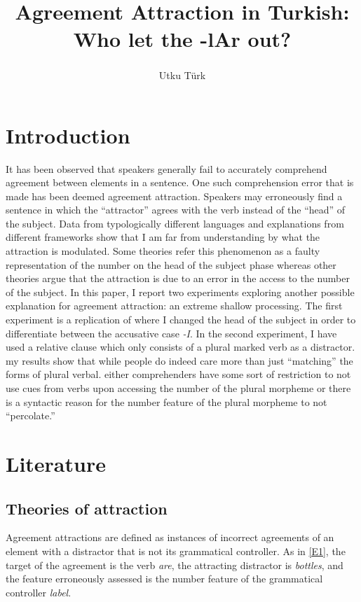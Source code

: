 \documentclass[doc]{apa6}
\title{Agreement Attraction in Turkish: Who let the -lAr out?}
\author{Utku Türk\textsuperscript{}}
\date{}
\affiliation{
\vspace{0.5cm}
\textsuperscript{} Boğaziçi University}
\begin{document}
\maketitle

\section*{Introduction}

It has been observed that speakers generally fail to accurately comprehend agreement between elements in a sentence. One such comprehension error that is made has been deemed agreement attraction. Speakers may erroneously find a sentence in which the \enquote{attractor} agrees with the verb instead of the \enquote{head} of the subject. Data from typologically different languages and explanations from different frameworks show that I am far from understanding by what the attraction is modulated. Some theories refer this phenomenon as a faulty representation of the number on the head of the subject phase whereas other theories argue that the attraction is due to an error in the access to the number of the subject. In this paper, I report two experiments exploring another possible explanation for agreement attraction: an extreme shallow processing. The first experiment is a replication of \textcite{Lago2018} where I changed the head of the subject in order to differentiate between the accusative case \emph{-I}. In the second experiment, I have used a relative clause which only consists of a plural marked verb as a distractor. my results show that while people do indeed care more than just \enquote{matching} the forms of plural verbal. either comprehenders have some sort of restriction to not use cues from verbs upon accessing the number of the plural morpheme or there is a syntactic reason for the number feature of the plural morpheme to not \enquote{percolate.}

\hypertarget{literature}{%
\section{Literature}\label{literature}}

\hypertarget{theories-of-attraction}{%
\subsection{Theories of attraction}\label{theories-of-attraction}}

Agreement attractions are defined as instances of incorrect agreements of an element with a distractor that is not its grammatical controller. As in \autoref{E1}, the target of the agreement is the verb \emph{are}, the attracting distractor is \emph{bottles}, and the feature erroneously assessed is the number feature of the grammatical controller \emph{label}.
\end{document}
